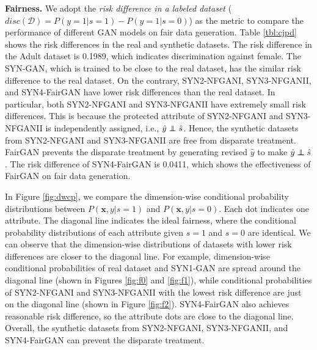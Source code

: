 \documentclass[sigconf]{acmart}
\theoremstyle{definition}
\newcommand\independent{\protect\mathpalette{\protect\independenT}{\perp}}
\def\independenT#1#2{\mathrel{\rlap{$#1#2$}\mkern2mu{#1#2}}}
\begin{document}
{\bf \noindent Fairness.}
We adopt the \textit{risk difference in a labeled dataset} ($disc(\mathcal{D}) = P(y=1|s=1)-P(y=1|s=0)$) as the metric to compare the performance of different GAN models on fair data generation. Table \ref{tbl:cjpd} shows the risk differences in the real and synthetic datasets. The risk difference in the Adult dataset is 0.1989, which indicates discrimination against female. The SYN-GAN, which is trained to be close to the real dataset, has the similar risk difference to the real dataset. On the contrary, SYN2-NFGANI, SYN3-NFGANII, and SYN4-FairGAN have lower risk differences than the real dataset. In particular, both SYN2-NFGANI and SYN3-NFGANII have extremely small risk differences. This is because the protected attribute of SYN2-NFGANI and SYN3-NFGANII is independently assigned, i.e., $\hat{y} \independent \hat{s}$. Hence, the synthetic datasets from SYN2-NFGANI and SYN3-NFGANII are free from disparate treatment. FairGAN prevents the disparate treatment by generating revised $\hat{y}$ to make $\hat{y} \independent \hat{s}$.
The risk difference of SYN4-FairGAN is 0.0411, which shows the effectiveness of FairGAN on fair data generation.  


In Figure \ref{fig:dwcp}, we compare the dimension-wise conditional probability distributions between $P(\mathbf{x},y|s=1)$ and $P(\mathbf{x},y|s=0)$. Each dot indicates one attribute. The diagonal line indicates the ideal fairness, where the conditional probability distributions of each attribute given $s = 1$ and $s = 0$ are identical. We can observe that the dimension-wise distributions of datasets with lower risk differences are closer to the diagonal line. For example, dimension-wise conditional probabilities of real dataset and SYN1-GAN are spread around the diagonal line (shown in Figures \ref{fig:f0} and \ref{fig:f1}), while conditional probabilities of SYN2-NFGANI and SYN3-NFGANII with the lowest risk difference are just on the diagonal line (shown in Figure \ref{fig:f2}). SYN4-FairGAN also achieves reasonable risk difference, so the attribute dots are close to the diagonal line. Overall, the synthetic datasets from SYN2-NFGANI, SYN3-NFGANII, and SYN4-FairGAN can prevent the disparate treatment.
\end{document}
